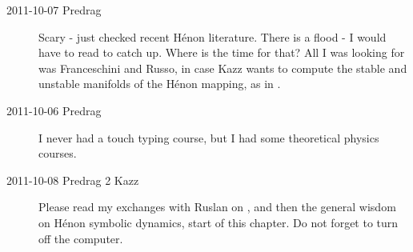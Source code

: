 \begin{description}
  	
\item[2011-10-07 Predrag] Scary - just checked recent H\'enon literature.
There is a flood - I would have to read
to catch up. Where is the time for that? All I was looking for was
Franceschini and Russo, in case Kazz wants to compute
the stable and unstable manifolds of the {H\'enon} mapping, as in
.


\item[2011-10-06 Predrag]
%
I never had a touch typing course, but I had some theoretical physics
courses.

\item[2011-10-08 Predrag 2 Kazz] Please read my exchanges with Ruslan on
, and then the general wisdom on
H\'enon symbolic dynamics, start of this chapter. Do not forget to
turn off the computer.


\end{description}
